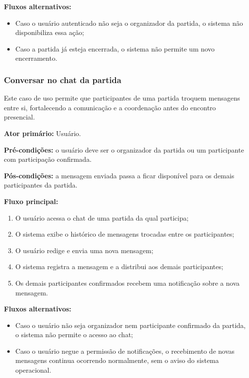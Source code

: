 \documentclass[a4paper, 12pt]{article}
\begin{document}
\begin{justify}
\textbf{Fluxos alternativos:}

\begin{itemize}
    \item Caso o usuário autenticado não seja o organizador da partida, o sistema não disponibiliza essa ação;
    \item Caso a partida já esteja encerrada, o sistema não permite um novo encerramento.
\end{itemize}

\subsubsection{Conversar no chat da partida}

Este caso de uso permite que participantes de uma partida troquem mensagens entre si, fortalecendo a comunicação e a coordenação antes do encontro presencial.

\textbf{Ator primário:} Usuário.

\textbf{Pré-condições:} o usuário deve ser o organizador da partida ou um participante com participação confirmada.

\textbf{Pós-condições:} a mensagem enviada passa a ficar disponível para os demais participantes da partida.

\textbf{Fluxo principal:}

\begin{enumerate}
    \item O usuário acessa o chat de uma partida da qual participa;
    \item O sistema exibe o histórico de mensagens trocadas entre os participantes;
    \item O usuário redige e envia uma nova mensagem;
    \item O sistema registra a mensagem e a distribui aos demais participantes;
    \item Os demais participantes confirmados recebem uma notificação sobre a nova mensagem.
\end{enumerate}

\textbf{Fluxos alternativos:}

\begin{itemize}
    \item Caso o usuário não seja organizador nem participante confirmado da partida, o sistema não permite o acesso ao chat;
    \item Caso o usuário negue a permissão de notificações, o recebimento de novas mensagens continua ocorrendo normalmente, sem o aviso do sistema operacional.
\end{itemize}


\end{justify}
\end{document}
